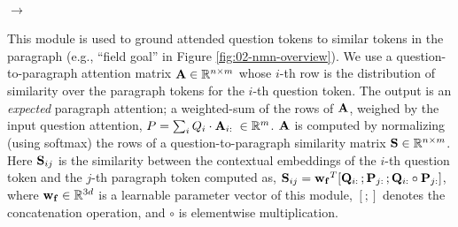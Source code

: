 \documentclass[main.tex]{subfiles}
\begin{document}
\paragraph{ $\rightarrow$ }
This module is used to ground attended question tokens to similar tokens in the paragraph (e.g., ``field goal'' in Figure \ref{fig:02-nmn-overview}).
We use a question-to-paragraph attention matrix $\mathbf{A} \in \mathbb{R}^{n \times m}$ whose $i$-th row is the distribution of similarity over the paragraph tokens for the $i$-th question token.
The output is an \textit{expected} paragraph attention; a weighted-sum of the rows of $\mathbf{A}$, weighed by the input question attention, $P = \sum_i Q_i \cdot \mathbf{A}_{i:} \; \in \mathbb{R}^{m}$.
$\mathbf{A}$ is computed by normalizing (using softmax) the rows of a question-to-paragraph similarity matrix $\mathbf{S} \in \mathbb{R}^{n \times m}$.
Here $\mathbf{S}_{ij}$ is the similarity between the contextual embeddings of the $i$-th question token and the $j$-th paragraph token computed as, $\mathbf{S}_{ij} = \mathbf{w_{f}}^{T} [\mathbf{Q}_{i:}\, ; \mathbf{P}_{j:}\, ; \mathbf{Q}_{i:} \circ \mathbf{P}_{j:}]$, where $\mathbf{w_{f}} \in \mathbb{R}^{3d}$ is a learnable parameter vector of this module, $[;]$ denotes the concatenation operation, and $\circ$ is elementwise multiplication.


\end{document}
